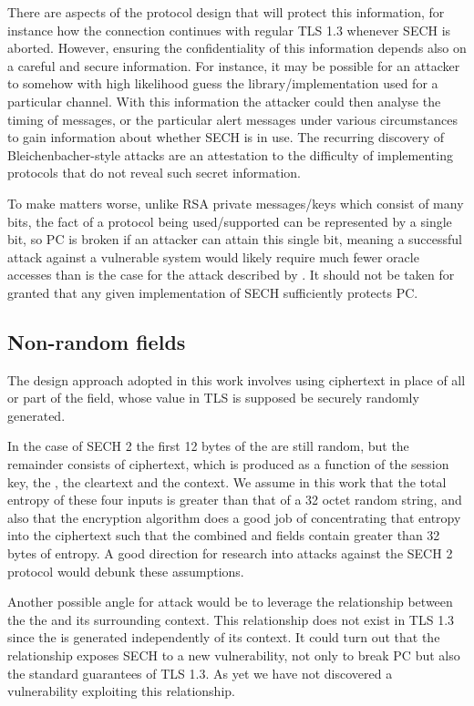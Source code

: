 There are aspects of the protocol design that will protect this information, for instance how the connection continues with regular \ac{TLS} 1.3 whenever \ac{SECH} is aborted.
However, ensuring the confidentiality of this information depends also on
a careful and secure information. For instance, it may be possible for an attacker to somehow with high likelihood guess the library/implementation used for a particular channel. With this information the attacker could then analyse the timing of messages, or the particular alert messages under various circumstances to gain information about whether \ac{SECH} is in use.
The recurring discovery of Bleichenbacher-style attacks \citep{ronen2019ninelivesbleichenbacher} are an attestation to the difficulty of implementing protocols that do not reveal such secret information.

To make matters worse, unlike \ac{RSA} private messages/keys which consist of many bits, the fact of a protocol being used/supported can be represented by a single bit, so \ac{PC} is broken if an attacker can attain this single bit, meaning a successful attack against a vulnerable system would likely require much fewer oracle accesses than is the case for the attack described by \cite{bleichenbacher1998chosen}. It should not be taken for granted that any given implementation of \ac{SECH} sufficiently protects \ac{PC}.

\subsection{Non-random  fields}
The design approach adopted in this work involves
using ciphertext in place of all or part of the 
 field, whose value in \ac{TLS} is
supposed be securely randomly generated.

In the case of \ac{SECH} 2 the first 12 bytes of the 
are still random, but the remainder consists of
ciphertext, which is produced as a function of the session key,
the \nonce, the cleartext and the context.
We assume in this work that the total entropy of these
four inputs is greater than that of a 32 octet random string,
and also that the encryption algorithm does a good job of
concentrating that entropy into the ciphertext such that the
combined  and \varlegacysessionid{} fields contain
greater than 32 bytes of entropy.
A good direction for research into attacks against the \ac{SECH} 2
protocol would debunk these assumptions.

Another possible angle for attack would be to leverage
the relationship between the the  and its
surrounding context.
This relationship does not exist in \ac{TLS} 1.3
since the  is generated independently of its context.
It could turn out that the relationship exposes \ac{SECH}
to a new vulnerability, not only to break \ac{PC}
but also the standard guarantees of \ac{TLS} 1.3.
As yet we have not discovered a vulnerability exploiting this
relationship.


